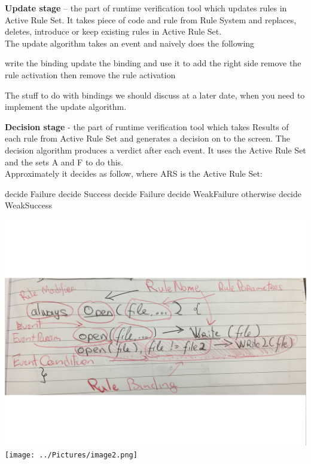 \documentclass[a4paper]{article}
\begin{document}
\vfill

\textbf{Update stage} – the part of runtime verification tool which updates rules in Active Rule Set. It takes piece of code and rule from Rule System and replaces, deletes, introduce or keep existing rules in Active Rule Set.\\
The update algorithm takes an event and naively does the following\\

\begin{algorithmic}
      \STATE write the binding 
      \STATE update the binding and use it to add the right side
        \STATE remove the rule activation
      \ENDIF
        \STATE then remove the rule activation
      \ENDIF
    \ENDIF 
  \ENDFOR 
\ENDFOR 
\end{algorithmic}
\vfill
The stuff to do with bindings we should discuss at a later date, when you need to implement the update algorithm. \par

\vfill

\textbf{Decision stage} - the part of runtime verification tool which takes Results of each rule from Active Rule Set and generates a decision on to the screen.
The decision algorithm produces a verdict after each event. It uses the Active Rule Set and the sets A and F to do this.\\
Approximately it decides as follow, where ARS is the Active Rule Set:
\begin{algorithmic}
  \STATE decide Failure
\ELSE
    \STATE decide Success
  \ENDIF
\ELSE
    \STATE decide Failure
  \ENDIF
\ELSE
    \STATE decide WeakFailure
  \ENDIF
\ELSE
  \STATE otherwise decide WeakSuccess
\ENDIF
\end{algorithmic}

\includegraphics[width=\textwidth,height=\textheight,keepaspectratio]{../Pictures/image1.png}
\texttt{[image: ../Pictures/image2.png]}
\end{document}
